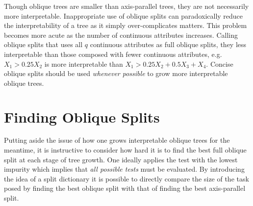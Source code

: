 Though oblique trees are smaller than axis-parallel trees, they are not necessarily more interpretable. Inappropriate use of oblique splits can paradoxically reduce the interpretability of a tree as it simply over-complicates matters. This problem becomes more acute as the number of continuous attributes increases. Calling oblique splits that uses all $q$ continuous attributes as full oblique splits, they less interpretable than those composed with fewer continuous attributes, e.g. $X_1>0.25 X_2$ is more interpretable than $X_1>0.25 X_2+0.5 X_3+X_4$. Concise oblique splits should be used \emph{whenever possible} to grow more interpretable oblique trees.

\section{Finding Oblique Splits}
\label{FindingObliqueSplits}
Putting aside the issue of how one grows interpretable oblique trees for the meantime, it is instructive to consider how hard it is to find the best full oblique split at each stage of tree growth. One ideally applies the test with the lowest impurity which implies that \emph{all possible tests} must be evaluated. By introducing the idea of a split dictionary it is possible to directly compare the size of the task posed by finding the best oblique split with that of finding the best axis-parallel split. \\

